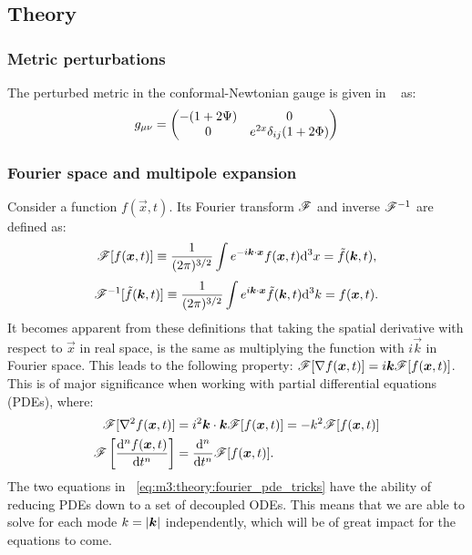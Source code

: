 \subsection{Theory}\label{sec:m3:theory}

\subsubsection{Metric perturbations}
    The perturbed metric in the conformal-Newtonian gauge is given in ~\cite{https://doi.org/10.48550/arxiv.astro-ph/0606683} as:
    \begin{equation}\label{eq:m3:theory:perturbed_metric}
        g_{\mu\nu} = \begin{pmatrix}
            -(1+2\Psi) & 0 \\
            0 & e^{2x}\delta_{ij}(1+2\Phi)
        \end{pmatrix}
    \end{equation}

\subsubsection{Fourier space and multipole expansion}
    Consider a function $f(\vec{x},t)$. Its Fourier transform $\mathscr{F}$ and inverse $\mathscr{F}^{-1}$ are defined as:
    \begin{equation}\label{eq:m3:theory:fourier_def}
            \mathscr{F}[f(\boldsymbol{x},t)]  \equiv \frac{1}{(2\pi)^{3/2}}\int e^{-i\boldsymbol{k}\cdot\boldsymbol{x}}f(\boldsymbol{x},t)\mathrm{d}^3 x = \tilde{f}(\boldsymbol{k},t),
    \end{equation}
    \begin{equation}\label{eq:m3:theory:fourier_inv_def}
        \mathscr{F}^{-1}[\tilde{f}(\boldsymbol{k},t)] \equiv \frac{1}{(2\pi)^{3/2}}\int e^{i\boldsymbol{k}\cdot\boldsymbol{x}}\tilde{f}(\boldsymbol{k},t)\mathrm{d}^3 k = f(\boldsymbol{x},t).
    \end{equation}
    It becomes apparent from these definitions that taking the spatial derivative with respect to $\vec{x}$ in real space, is the same as multiplying the function with $i\vec{k}$ in Fourier space. This leads to the following property: $\mathscr{F}[\nabla f(\boldsymbol{x},t)] = i\boldsymbol{k}\mathscr{F}[f(\boldsymbol{x},t)]$. This is of major significance when working with partial differential equations (PDEs), where:
    \begin{equation}\label{eq:m3:theory:fourier_pde_tricks}
        \begin{split}
            \mathscr{F}[\nabla^2f(\boldsymbol{x},t)] &= i^2\boldsymbol{k}\cdot\boldsymbol{k}\mathscr{F}[f(\boldsymbol{x},t)] = -k^2\mathscr{F}[f(\boldsymbol{x},t)]\\
            \mathscr{F}\left[\dv[n]{f(\ensuremath{\boldsymbol{x}},t)}{t}\right] &= \dv[n]{t}\mathscr{F}[f(\boldsymbol{x},t)].
        \end{split}
    \end{equation} 
    The two equations in ~\cref{eq:m3:theory:fourier_pde_tricks} have the ability of reducing PDEs down to a set of decoupled ODEs. This means that we are able to solve for each mode $k=\abs{\boldsymbol{k}}$ independently, which will be of great impact for the equations to come. 

